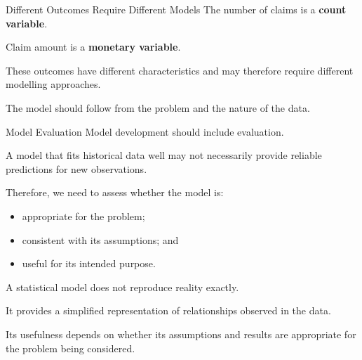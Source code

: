 \documentclass[
  ignorenonframetext,
  aspectratio=169,
]{beamer}
\providecommand{\tightlist}{%
  \setlength{\itemsep}{0pt}\setlength{\parskip}{0pt}}
\begin{document}
\begin{frame}{Different Outcomes Require Different Models}
\protect{}\label{different-outcomes-require-different-models}
The number of claims is a \textbf{count variable}.

Claim amount is a \textbf{monetary variable}.

These outcomes have different characteristics and may therefore require
different modelling approaches.

The model should follow from the problem and the nature of the data.
\end{frame}

\begin{frame}{Model Evaluation}
\protect{}\label{model-evaluation}
Model development should include evaluation.

A model that fits historical data well may not necessarily provide
reliable predictions for new observations.

Therefore, we need to assess whether the model is:

\begin{itemize}
\tightlist
\item
  appropriate for the problem;
\item
  consistent with its assumptions; and
\item
  useful for its intended purpose.
\end{itemize}

\begin{tcolorbox}[enhanced jigsaw, arc=.35mm, bottomrule=.15mm, bottomtitle=1mm, breakable, colback=white, colbacktitle=quarto-callout-important-color!10!white, colframe=quarto-callout-important-color-frame, coltitle=black, left=2mm, leftrule=.75mm, opacityback=0, opacitybacktitle=0.6, rightrule=.15mm, title=\textcolor{quarto-callout-important-color}{\faExclamation}\hspace{0.5em}{A model is an approximation}, titlerule=0mm, toprule=.15mm, toptitle=1mm]

A statistical model does not reproduce reality exactly.

It provides a simplified representation of relationships observed in the
data.

Its usefulness depends on whether its assumptions and results are
appropriate for the problem being considered.

\end{tcolorbox}
\end{frame}
\end{document}
